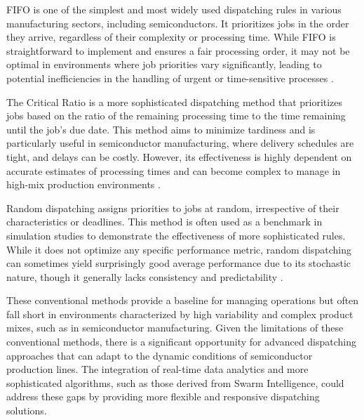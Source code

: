 FIFO is one of the simplest and most widely used dispatching rules in various manufacturing sectors, including semiconductors. It prioritizes jobs in the order they arrive, regardless of their complexity or processing time. While FIFO is straightforward to implement and ensures a fair processing order, it may not be optimal in environments where job priorities vary significantly, leading to potential inefficiencies in the handling of urgent or time-sensitive processes \cite{kumar1993}.

The Critical Ratio is a more sophisticated dispatching method that prioritizes jobs based on the ratio of the remaining processing time to the time remaining until the job's due date. This method aims to minimize tardiness and is particularly useful in semiconductor manufacturing, where delivery schedules are tight, and delays can be costly. However, its effectiveness is highly dependent on accurate estimates of processing times and can become complex to manage in high-mix production environments \cite{baker1974}. 

Random dispatching assigns priorities to jobs at random, irrespective of their characteristics or deadlines. This method is often used as a benchmark in simulation studies to demonstrate the effectiveness of more sophisticated rules. While it does not optimize any specific performance metric, random dispatching can sometimes yield surprisingly good average performance due to its stochastic nature, though it generally lacks consistency and predictability \cite{blackstone1982}. 

These conventional methods provide a baseline for managing operations but often fall short in environments characterized by high variability and complex product mixes, such as in semiconductor manufacturing. %
Given the limitations of these conventional methods, there is a significant opportunity for advanced dispatching approaches that can adapt to the dynamic conditions of semiconductor production lines. The integration of real-time data analytics and more sophisticated algorithms, such as those derived from Swarm Intelligence, could address these gaps by providing more flexible and responsive dispatching solutions.

























